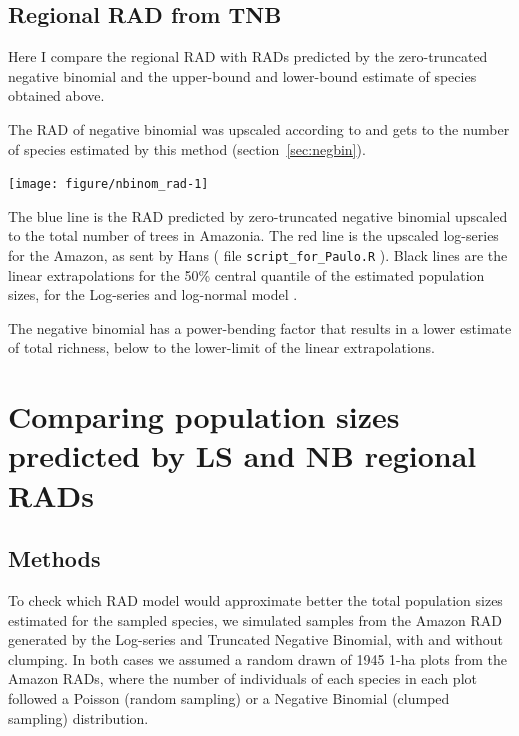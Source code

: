 \documentclass[12pt, A4]{article}\usepackage[]{graphicx}\usepackage[]{color}
\newenvironment{knitrout}{}{} %
\newcommand{\code}[1]{\texttt{#1}}
\begin{document}
\subsection*{Regional RAD from TNB}

Here I compare the regional RAD with RADs predicted  by 
the zero-truncated negative binomial and the upper-bound and lower-bound estimate of species
obtained above.

The RAD of negative binomial was upscaled according to \citep{tovo2017} 
and gets to the number of species estimated by this method (section~\ref{sec:negbin}).

\begin{knitrout}
\color{fgcolor}

{\centering \texttt{[image: figure/nbinom\_rad-1]} 

}



\end{knitrout}

The blue line is the RAD predicted by zero-truncated negative binomial upscaled to the total number of
trees in Amazonia. %
The red line is the upscaled log-series for the Amazon,
as sent by Hans ( file \code{script\_for\_Paulo.R} ). 
Black lines are the linear extrapolations for the 50\% 
central quantile of the estimated population sizes, for
the Log-series and log-normal model \citep{ulrich2005}.

The negative binomial has a power-bending factor that
results in a lower estimate of total richness, below to
the lower-limit of the linear extrapolations.

\section{Comparing population sizes predicted by LS and NB regional RADs}

\subsection*{Methods}

To check which RAD model would approximate better the total population sizes estimated
for the sampled species, we simulated samples from the Amazon RAD generated by the Log-series 
and Truncated Negative Binomial, with and without clumping. 
In both cases we assumed a random drawn of 1945 1-ha plots
from the Amazon RADs, where the number of individuals of each species
in each plot followed a Poisson (random sampling) or a Negative Binomial (clumped sampling)
distribution. 
\end{document}
